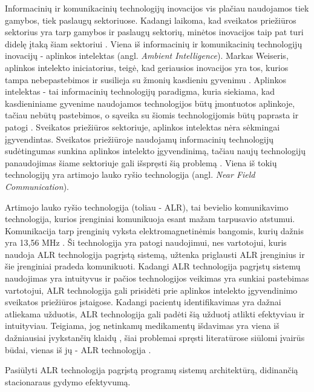 Informacinių ir komunikacinių technologijų inovacijos vis plačiau naudojamos tiek gamybos, tiek paslaugų sektoriuose. Kadangi laikoma, kad sveikatos priežiūros sektorius yra tarp gamybos ir paslaugų sektorių, minėtos inovacijos taip pat turi didelę įtaką šiam sektoriui \cite{Puma2012}. Viena iš informacinių ir komunikacinių technologijų inovacijų - aplinkos intelektas (angl. \textit{Ambient Intelligence}). Markas Weiseris, aplinkos intelekto iniciatorius, teigė, kad geriausios inovacijos yra tos, kurios tampa nebepastebimos ir susilieja su žmonių kasdieniu gyvenimu \cite{Cook2009}. Aplinkos intelektas - tai informacinių technologijų paradigma, kuria siekiama, kad kasdieniniame gyvenime naudojamos technologijos būtų įmontuotos aplinkoje, tačiau nebūtų pastebimos, o sąveika su šiomis technologijomis būtų paprasta ir patogi \cite{Bravo2008}. Sveikatos priežiūros sektoriuje, aplinkos intelektas nėra sėkmingai įgyvendintas. Sveikatos priežiūroje naudojamų informacinių technologijų sudėtingumas sunkina aplinkos intelekto įgyvendinimą, tačiau naujų technologijų panaudojimas šiame sektoriuje gali išspręsti šią problemą \cite{Fontecha2011}. Viena iš tokių technologijų yra artimojo lauko ryšio technologija (angl. \textit{Near Field Communication}). 

Artimojo lauko ryšio technologija (toliau - ALR), tai bevielio komunikavimo technologija, kurios įrenginiai komunikuoja esant mažam tarpusavio atstumui. Komunikacija tarp įrenginių vyksta elektromagnetinėmis bangomis, kurių dažnis yra 13,56 MHz \cite{Leora1980}. Ši technologija yra patogi naudojimui, nes vartotojui, kuris naudoja ALR technologija pagrįstą sistemą, užtenka priglausti ALR įrenginius ir šie įrenginiai pradeda komunikuoti. Kadangi ALR technologija pagrįstų sistemų naudojimas yra intuityvus ir pačios technologijos veikimas yra sunkiai pastebimas vartotojui, ALR technologija gali prisidėti prie aplinkos intelekto įgyvendinimo sveikatos priežiūros įstaigose. Kadangi pacientų identifikavimas yra dažnai atliekama užduotis, ALR technologija gali padėti šią užduotį atlikti efektyviau ir intuityviau. Teigiama, jog netinkamų medikamentų išdavimas yra viena iš dažniausiai įvykstančių klaidų \cite{Agrawal2009}, šiai problemai spręsti literatūrose siūlomi įvairūs būdai, vienas iš jų - ALR technologija \cite{Gautam}.



Pasiūlyti ALR technologija pagrįstą programų sistemų architektūrą, didinančią stacionaraus gydymo efektyvumą.
    
